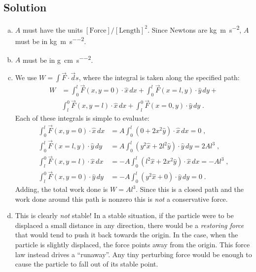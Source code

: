 \documentclass[solutions]{esg8022pset}
\begin{document}
\subsection{Solution}
  \begin{enumerate}[(a)]
    \item $A$ must have the units $[\text{Force}]/[\text{Length}]^2$.  Since
      Newtons are \si{\kilo\gram\meter\per\second\squared}, $A$ must be in \si{\kilo\gram\per\meter\per\second\squared}.
    \item $A$ must be in \si{\gram\per\centi\meter\per\second\squared}.
    \item We use $W = \int {\vec F}\cdot{\vec ds}$, where the
      integral is taken along the specified path:
      \begin{align*}
        W & =
          \int_0^l {\vec F}(x,y=0)\cdot{\hat x\,dx} +
          \int_0^l {\vec F}(x = l,y)\cdot{\hat y\,dy} +\\
          & \int_l^0 {\vec F}(x,y=l)\cdot{\hat x\,dx} +
          \int_l^0 {\vec F}(x = 0,y)\cdot{\hat y\,dy}\;.
      \end{align*}
      Each of these integrals is simple to evaluate:
      \begin{align*}
        \int_0^l {\vec F}(x,y = 0)\cdot{\hat x\,dx} & =
          A \int_0^l (0 + 2x^2\hat y)\cdot\hat x\,dx = 0\;,\\
        \int_0^l {\vec F}(x = l,y)\cdot{\hat y\,dy} & =
          A \int_0^l (y^2\hat x + 2l^2\hat y)\cdot\hat y\,dy = 2 A l^3\;,\\
        \int_l^0 {\vec F}(x,y = l)\cdot{\hat x\,dx} & =
          -A \int_0^l (l^2\hat x + 2x^2\hat y)\cdot\hat x\,dx = -A l^3\;,\\
        \int_l^0 {\vec F}(x,y = 0)\cdot{\hat y\,dy} & =
          -A \int_0^l (y^2\hat x + 0)\cdot\hat y\,dy = 0\;.
      \end{align*}
      Adding, the total work done is $W = Al^3$.  Since this is a closed
      path and the work done around this path is nonzero this is \emph{not}
      a conservative force.
    \item This is clearly \emph{not} stable!  In a stable situation,
      if the particle were to be displaced a small distance in any
      direction, there would be a \emph{restoring force} that would tend to
      push it back towards the origin.  In the case, when the particle is
      slightly displaced, the force points away from the origin.  This force
      law instead drives a ``runaway''.  Any tiny perturbing force would be
      enough to cause the particle to fall out of its stable point.
  \end{enumerate}
\end{document}
